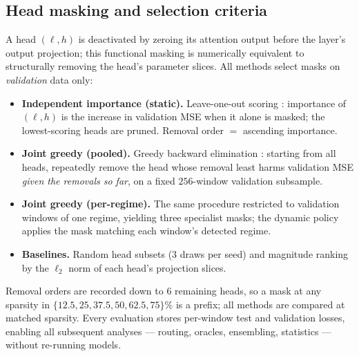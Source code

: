 \subsection{Head masking and selection criteria}
\label{sec:methods-selection}
A head $(\ell,h)$ is deactivated by zeroing its attention output before
the layer's output projection; this functional masking is numerically
equivalent to structurally removing the head's parameter slices. All
methods select masks on \emph{validation} data only:
\begin{itemize}
  \item \textbf{Independent importance (static).} Leave-one-out scoring
  \citep{michel2019sixteen}: importance of $(\ell,h)$ is the increase in
  validation MSE when it alone is masked; the lowest-scoring heads are
  pruned. Removal order $=$ ascending importance.
  \item \textbf{Joint greedy (pooled).} Greedy backward elimination
  \citep{li2021differentiable}: starting from all heads, repeatedly
  remove the head whose removal least harms validation MSE \emph{given
  the removals so far}, on a fixed $256$-window validation subsample.
  \item \textbf{Joint greedy (per-regime).} The same procedure restricted
  to validation windows of one regime, yielding three specialist masks;
  the dynamic policy applies the mask matching each window's detected
  regime.
  \item \textbf{Baselines.} Random head subsets ($3$ draws per seed) and
  magnitude ranking by the $\ell_2$ norm of each head's projection
  slices.
\end{itemize}
Removal orders are recorded down to $6$ remaining heads, so a mask at any
sparsity in $\{12.5,25,37.5,50,62.5,75\}\%$ is a prefix; all methods are
compared at matched sparsity. Every evaluation stores per-window test and
validation losses, enabling all subsequent analyses --- routing, oracles,
ensembling, statistics --- without re-running models.

